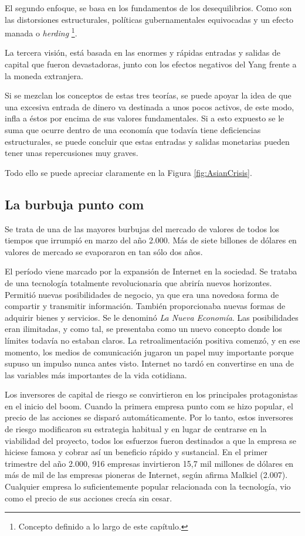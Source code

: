El segundo enfoque, se basa en los fundamentos de los desequilibrios. Como son las distorsiones estructurales, políticas gubernamentales equivocadas y un efecto manada o \emph{herding} \footnote{Concepto definido a lo largo de este capítulo.}.

La tercera visión, está basada en las enormes y rápidas entradas y salidas de capital que fueron devastadoras, junto con los efectos negativos del Yang frente a la moneda extranjera.

Si se mezclan los conceptos de estas tres teorías, se puede apoyar la idea de que una excesiva entrada de dinero va destinada a unos pocos activos, de este modo, infla a éstos por encima de sus valores fundamentales. Si a esto expuesto se le suma que ocurre dentro de una economía que todavía tiene deficiencias estructurales, se puede concluir que estas entradas y salidas monetarias pueden tener unas repercusiones muy graves.

Todo ello se puede apreciar claramente en la Figura \ref{fig:AsianCrisis}.


\subsection{La burbuja punto com}    
Se trata de una de las mayores burbujas del mercado de valores de todos los tiempos que irrumpió en marzo del año 2.000. Más de siete billones de dólares en valores de mercado se evaporaron en tan sólo dos años.

El período viene marcado por la expansión de Internet en la sociedad. Se trataba de una tecnología totalmente revolucionaria que abriría nuevos horizontes. Permitió nuevas posibilidades de negocio, ya que era una novedosa forma de compartir y transmitir información. También proporcionaba nuevas formas de adquirir bienes y servicios. Se le denominó \emph{La Nueva Economía}. Las posibilidades eran ilimitadas, y como tal, se presentaba como un nuevo concepto donde los límites todavía no estaban claros. La retroalimentación positiva comenzó, y en ese momento, los medios de comunicación jugaron un papel muy importante porque supuso un impulso nunca antes visto. Internet no tardó en convertirse en una de las variables más importantes de la vida cotidiana.

Los inversores de capital de riesgo se convirtieron en los principales protagonistas en el inicio del boom. Cuando la primera empresa punto com se hizo popular, el precio de las acciones se disparó automáticamente. Por lo tanto, estos inversores de riesgo modificaron su estrategia habitual y en lugar de centrarse en la viabilidad del proyecto, todos los esfuerzos fueron destinados a que la empresa se hiciese famosa y cobrar así un beneficio rápido y sustancial. En el primer trimestre del año 2.000, 916 empresas invirtieron 15,7 mil millones de dólares en más de mil de las empresas pioneras de Internet, según afirma Malkiel (2.007). Cualquier empresa lo suficientemente popular relacionada con la tecnología, vio como el precio de sus acciones crecía sin cesar.

